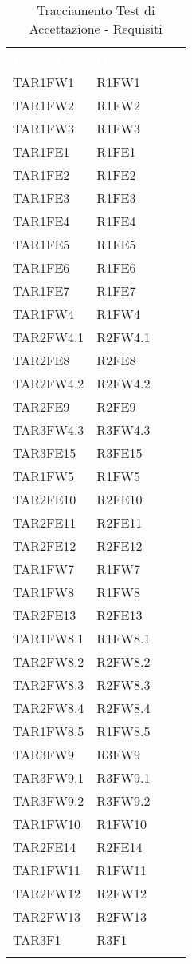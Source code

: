 \renewcommand{\arraystretch}{1.5}
\begin{longtable}{ m{}<{\centering}  m{}<{\centering} }
	\rowcolor{darkblue}
	\textcolor{white}{\textbf{ID Test}} &\textcolor{white}{\textbf{ID Requisito}}\\ 
	 
	TAR1FW1 & R1FW1 \\
	TAR1FW2 &  R1FW2 \\
	TAR1FW3 & R1FW3 \\
	TAR1FE1 & R1FE1 \\
	TAR1FE2 & R1FE2 \\
	TAR1FE3 & R1FE3 \\
	TAR1FE4 & R1FE4 \\
	TAR1FE5 & R1FE5 \\
	TAR1FE6 & R1FE6 \\
	TAR1FE7 & R1FE7 \\
	TAR1FW4 & R1FW4 \\
	TAR2FW4.1 & R2FW4.1 \\
	TAR2FE8 & R2FE8 \\
	TAR2FW4.2 & R2FW4.2 \\
	TAR2FE9 & R2FE9 \\
	TAR3FW4.3 & R3FW4.3\\
	TAR3FE15 & R3FE15 \\
	TAR1FW5 & R1FW5 \\
	TAR2FE10 & R2FE10 \\	 
	TAR2FE11 & R2FE11 \\
	TAR2FE12 & R2FE12 \\
	TAR1FW7 & R1FW7 \\
	TAR1FW8 & R1FW8 \\
	TAR2FE13 & R2FE13 \\
	TAR1FW8.1 & R1FW8.1 \\
	TAR2FW8.2 & R2FW8.2 \\
	TAR2FW8.3 & R2FW8.3 \\
	TAR2FW8.4 & R2FW8.4 \\
	TAR1FW8.5 & R1FW8.5 \\
	TAR3FW9 & R3FW9 \\
	TAR3FW9.1 & R3FW9.1 \\
	TAR3FW9.2 & R3FW9.2 \\
	TAR1FW10 & R1FW10 \\
	TAR2FE14 & R2FE14  \\
	TAR1FW11 & R1FW11 \\
	TAR2FW12 & R2FW12 \\
	TAR2FW13 & R2FW13 \\
	TAR3F1 & R3F1 \\

\caption{Tracciamento Test di Accettazione - Requisiti}
\end{longtable}